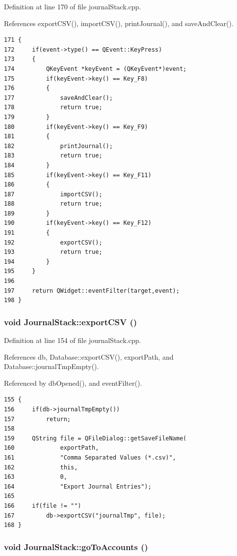 Definition at line 170 of file journal\-Stack.cpp.

References export\-CSV(), import\-CSV(), print\-Journal(), and save\-And\-Clear().

\footnotesize\begin{verbatim}171 {
172     if(event->type() == QEvent::KeyPress)
173     {
174         QKeyEvent *keyEvent = (QKeyEvent*)event;
175         if(keyEvent->key() == Key_F8)
176         {
177             saveAndClear();
178             return true;
179         }
180         if(keyEvent->key() == Key_F9)
181         {
182             printJournal();
183             return true;
184         }
185         if(keyEvent->key() == Key_F11)
186         {
187             importCSV();
188             return true;
189         }
190         if(keyEvent->key() == Key_F12)
191         {
192             exportCSV();
193             return true;
194         }
195     }
196     
197     return QWidget::eventFilter(target,event);
198 }
\end{verbatim}\normalsize 


\hypertarget{classJournalStack_k2}{
\subsubsection[exportCSV]{\setlength{\rightskip}{0pt plus 5cm}void Journal\-Stack::export\-CSV ()}}
\label{classJournalStack_k2}


Definition at line 154 of file journal\-Stack.cpp.

References db, Database::export\-CSV(), export\-Path, and Database::journal\-Tmp\-Empty().

Referenced by db\-Opened(), and event\-Filter().

\footnotesize\begin{verbatim}155 {
156     if(db->journalTmpEmpty())
157         return;
158 
159     QString file = QFileDialog::getSaveFileName(
160             exportPath,
161             "Comma Separated Values (*.csv)",
162             this,
163             0,
164             "Export Journal Entries");
165 
166     if(file != "")
167         db->exportCSV("journalTmp", file);
168 }
\end{verbatim}\normalsize 


\hypertarget{classJournalStack_l1}{
\subsubsection[goToAccounts]{\setlength{\rightskip}{0pt plus 5cm}void Journal\-Stack::go\-To\-Accounts ()}}
\label{classJournalStack_l1}




